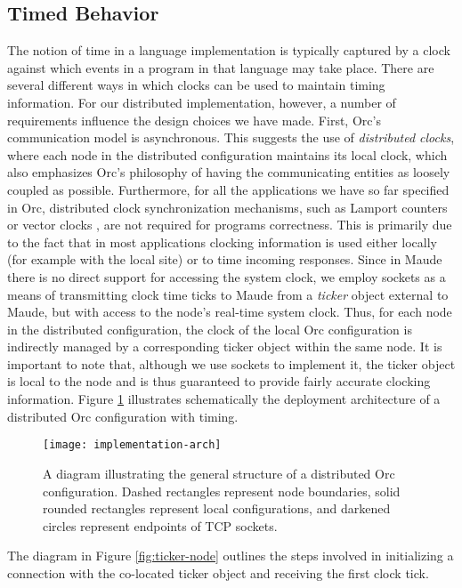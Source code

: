 \documentclass{eptcs}
\begin{document}
\subsection{Timed Behavior} \label{sec:timed-implementation}


The notion of time in a language implementation is typically captured by a clock against which events in a program in that language may take place. There are several different ways in which clocks can be used to maintain timing information. For our distributed implementation, however, a number of requirements influence the design choices we have made. First, Orc's communication model is asynchronous. This suggests the use of \emph{distributed clocks}, where each node in the distributed configuration maintains its local clock, which also emphasizes Orc's philosophy of having the communicating entities as loosely coupled as possible. Furthermore, for all the applications we have so far specified in Orc, distributed clock synchronization mechanisms, such as Lamport counters \cite{Lamport78} or vector clocks \cite{Mattern89,Fidge88}, are not required for programs correctness. This is primarily due to the fact that in most applications clocking information is used either locally (for example with the local  site) or to time incoming responses. Since in Maude there is no direct support for accessing the system clock, we employ sockets as a means of transmitting clock time ticks to Maude from a \emph{ticker} object external to Maude, but with access to the node's real-time system clock. Thus, for each node in the distributed configuration, the clock of the local Orc configuration is indirectly managed by a corresponding ticker object within the same node. 
It is important to note that, although we use sockets to implement it, the ticker object is local to the node and is thus guaranteed to provide fairly accurate clocking information. Figure \ref{fig:dist-orc-conf} illustrates schematically the deployment architecture of a distributed Orc configuration with timing.

\begin{figure} 	
	\centering
	\texttt{[image: implementation-arch]}
	\caption{A diagram illustrating the general structure of a distributed Orc configuration. Dashed rectangles represent node boundaries, solid rounded rectangles represent local configurations, and darkened circles represent endpoints of TCP sockets.}
    \label{fig:dist-orc-conf}
\end{figure}


The diagram in Figure \ref{fig:ticker-node} outlines the steps involved in initializing a connection with the co-located ticker object and receiving the first clock tick.
\end{document}
